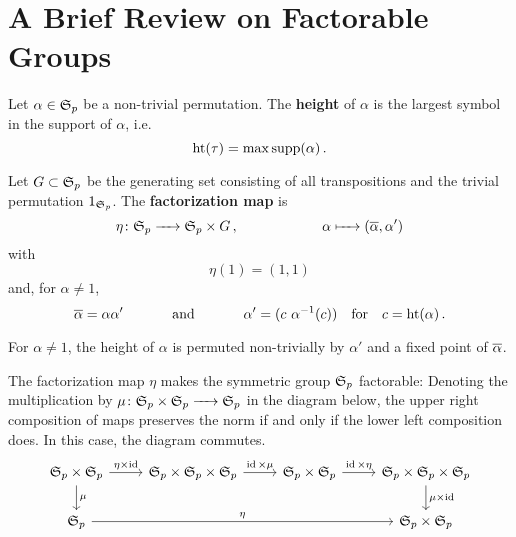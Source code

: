 \section{A Brief Review on Factorable Groups}
\label{notation:factorable_groups}

\begin{defi}
    \label{notation:height}
    Let $\alpha \in \Symgrp_p$ be a non-trivial permutation.
    The \textbf{height} of $\alpha$ is the largest symbol in the support of $\alpha$, i.e.\ 
    \[
        \height(\tau) = \max \supp(\alpha) \,.
    \]
\end{defi}

\begin{defi}
    \label{notation:factorization_map}
    Let $G \subset \SymGr_p$ be the generating set consisting of all transpositions and the trivial permutation $1_{\SymGr_p}$.
    The {\bf factorization map} is
    \[
        \eta \colon \SymGr_p \to \SymGr_p \times G\,, \mspc{}{30} \alpha \mapsto (\ov\alpha, \alpha') 
    \]
    with
    \[
        \eta(1) = (1,1)
    \]
    and, for $\alpha \neq 1$,
    \[
        \ov\alpha = \alpha \alpha' \mspc{and}{35} \alpha' = (c\ \alpha^{-1}(c)) \mspc{for}{10} c = \hgt(\alpha) \,.
    \]
\end{defi}

\begin{rem}
    \label{notation:height_rem}
    For $\alpha \neq 1$, the height of $\alpha$ is permuted non-trivially by $\alpha'$ and a fixed point of $\ov\alpha$.
\end{rem}

\begin{thm*}
    The factorization map $\eta$ makes the symmetric group $\Symgrp_p$ factorable:
    Denoting the multiplication by $\mu \colon \SymGr_p \times \SymGr_p \to \SymGr_p$ in the diagram below,
    the upper right composition of maps preserves the norm if and only if the lower left composition does.
    In this case, the diagram commutes.
    \[
        \begin{tikzcd}
            \SymGr_p \times \SymGr_p  \arrow{d}{\mu} \arrow{r}{\eta \times \id} & \SymGr_p \times \SymGr_p \times \SymGr_p \arrow{r}{\id \times \mu}    & \SymGr_p \times \SymGr_p \arrow{r}{\id \times \eta}   & \SymGr_p \times \SymGr_p \times \SymGr_p \arrow{d}{\mu \times \id} \\
            \SymGr_p \arrow{rrr}{\eta}                                          &                                                                       &                                                       & \SymGr_p \times \SymGr_p
        \end{tikzcd}
    \]
\end{thm*}

